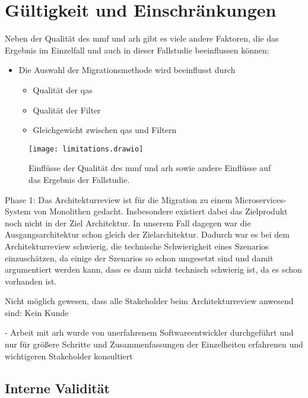 \chapter{Gültigkeit und Einschränkungen}
\label{chap:gueltigkeit}

Neben der Qualität des \gls{mmf} und \gls{arh} gibt es viele andere Faktoren, die das Ergebnis im Einzelfall und auch in dieser Fallstudie beeinflussen können:

\begin{itemize}
	\item Die Auswahl der Migrationsmethode wird beeinflusst durch
	\begin{itemize}
		\item Qualität der \glspl{qa}
		\item Qualität der Filter
		\item Gleichgewicht zwischen \glspl{qa} und Filtern
	\end{itemize}
\end{itemize}

\begin{figure}
	\centering
	\texttt{[image: limitations.drawio]}
	\caption[Einflüsse auf das Ergebnis der Fallstudie]{
		Einflüsse der Qualität des \gls{mmf} und \gls{arh} sowie andere Einflüsse auf das Ergebnis der Fallstudie.
	}
	\label{fig:limitations}
\end{figure}

Phase 1:
Das Architekturreview ist für die Migration zu einem Microservices-System von Monolithen gedacht.
Insbesondere existiert dabei das Zielprodukt noch nicht in der Ziel Architektur. 
In unserem Fall dagegen war die Ausgangsarchitektur schon gleich der Zielarchitektur.
Dadurch war es bei dem Architekturreview schwierig, die technische Schwierigkeit eines Szenarios einzuschätzen, da einige der Szenarios so schon umgesetzt sind und damit argumentiert werden kann, dass es dann nicht technisch schwierig ist, da es schon vorhanden ist.

Nicht möglich gewesen, dass alle Stakeholder beim Architekturreview anwesend sind: Kein Kunde  

- Arbeit mit \gls{arh} wurde von unerfahrenem Softwareentwickler durchgeführt und nur für größere Schritte und Zusammenfassungen der Einzelheiten erfahrenen und wichtigeren Stakeholder konsultiert

\section{Interne Validität}

